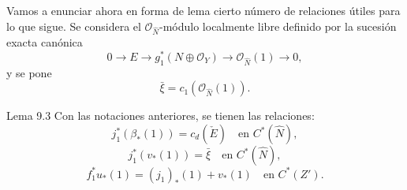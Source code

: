 Vamos a enunciar ahora en forma de lema cierto número de relaciones útiles para lo que sigue. Se considera el $\mathcal O_{\widehat N}$-módulo localmente libre definido por la sucesión exacta canónica
\[
0\to E\to g_1^*(N\oplus\mathcal O_Y)\to\mathcal O_{\widehat N}(1)\to0,
\tag{9.3.0}
\]
y se pone
\[
\bar\xi=c_1(\mathcal O_{\widehat N}(1)).
\tag{9.3.1}
\]

\begin{statement}{Lema 9.3}
Con las notaciones anteriores, se tienen las relaciones:
\[
j_1^*(\beta_*(1))=c_d(\check E)\quad\text{en }C^*(\widehat N),
\tag{9.3.2}
\]
\[
j_1^*(v_*(1))=\bar\xi\quad\text{en }C^*(\widehat N),
\tag{9.3.3}
\]
\[
f_1^*u_*(1)=(j_1)_*(1)+v_*(1)\quad\text{en }C^*(Z').
\tag{9.3.4}
\]
\end{statement}
